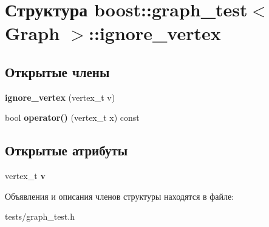 \hypertarget{structboost_1_1graph__test_1_1ignore__vertex}{}\section{Структура boost\+:\+:graph\+\_\+test$<$ Graph $>$\+:\+:ignore\+\_\+vertex}
\label{structboost_1_1graph__test_1_1ignore__vertex}
\subsection*{Открытые члены}
\begin{DoxyCompactItemize}
\item 
\mbox{\label{structboost_1_1graph__test_1_1ignore__vertex_a3b0a8c0b55d383b7aed8f155097180ff}} 
{\bfseries ignore\+\_\+vertex} (vertex\+\_\+t v)
\item 
\mbox{\label{structboost_1_1graph__test_1_1ignore__vertex_aa4fe8b58fd0e483b16afa523ddaf9322}} 
bool {\bfseries operator()} (vertex\+\_\+t x) const
\end{DoxyCompactItemize}
\subsection*{Открытые атрибуты}
\begin{DoxyCompactItemize}
\item 
\mbox{\label{structboost_1_1graph__test_1_1ignore__vertex_adcaccee3f1f378199eca3b00886cc3f2}} 
vertex\+\_\+t {\bfseries v}
\end{DoxyCompactItemize}


Объявления и описания членов структуры находятся в файле\+:\begin{DoxyCompactItemize}
\item 
tests/graph\+\_\+test.\+h\end{DoxyCompactItemize}
